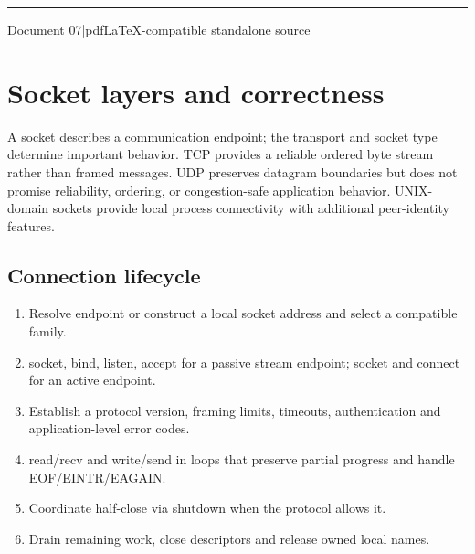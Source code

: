 \documentclass[11pt,letterpaper,oneside]{report}
\begin{document}
\hypersetup{pageanchor=false}%
\begin{titlepage}\centering{}\vspace{0.6cm}{\Large POSIX sockets, framing, event loops and resilient services\par}\vspace{2cm}\rule{0.75\textwidth}{1.2pt}\par\vspace{0.55cm}{\large An original companion to Michael Kerrisk\textquotesingle s 2010 text}\par\vspace{0.3cm}{\large Edition 1.0\quad |\quad October 2026}\par\vfill{\small Document 07\quad |\quad pdfLaTeX-compatible standalone source}\par\end{titlepage}\hypersetup{pageanchor=true}
\tableofcontents\clearpage
\chapter{Socket layers and correctness}
A socket describes a communication endpoint; the transport and socket type determine important behavior. TCP provides a reliable ordered byte stream rather than framed messages. UDP preserves datagram boundaries but does not promise reliability, ordering, or congestion-safe application behavior. UNIX-domain sockets provide local process connectivity with additional peer-identity features.

\section{Connection lifecycle}
\begin{enumerate}
\item Resolve endpoint or construct a local socket address and select a compatible family.
\item socket, bind, listen, accept for a passive stream endpoint; socket and connect for an active endpoint.
\item Establish a protocol version, framing limits, timeouts, authentication and application-level error codes.
\item read/recv and write/send in loops that preserve partial progress and handle EOF/EINTR/EAGAIN.
\item Coordinate half-close via shutdown when the protocol allows it.
\item Drain remaining work, close descriptors and release owned local names.
\end{enumerate}
\end{document}
